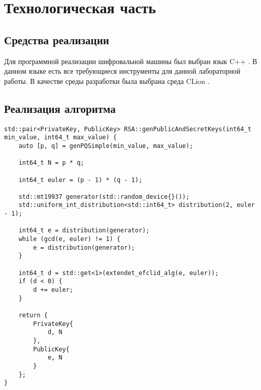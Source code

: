\chapter{Технологическая часть}

\section{Средства реализации}

Для программной реализации шифровальной машины был выбран язык C++ \cite{cpp}.
В данном языке есть все требующиеся инструменты для данной лабораторной работы.
В качестве среды разработки была выбрана среда CLion \cite{clion}.

\section{Реализация алгоритма}

\begin{lstlisting}[label=lst:aes,caption=Генерация ключей RSA]
std::pair<PrivateKey, PublicKey> RSA::genPublicAndSecretKeys(int64_t min_value, int64_t max_value) {
	auto [p, q] = genPQSimple(min_value, max_value);
	
	int64_t N = p * q;
	
	int64_t euler = (p - 1) * (q - 1);
	
	std::mt19937 generator(std::random_device{}());
	std::uniform_int_distribution<std::int64_t> distribution(2, euler - 1);
	
	int64_t e = distribution(generator);
	while (gcd(e, euler) != 1) {
		e = distribution(generator);
	}
	
	int64_t d = std::get<1>(extendet_efclid_alg(e, euler));
	if (d < 0) {
		d += euler;
	}
	
	return {
		PrivateKey{
			d, N
		},
		PublicKey{
			e, N
		}
	};
}
\end{lstlisting}